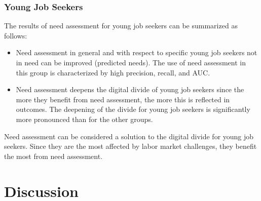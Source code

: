 \subsubsection{Young Job Seekers}
\label{sec:results_young}
The results of need assessment for young job seekers can be summarized as follows: 
\begin{itemize}
\item Need assessment in general and with respect to specific young job seekers not in need can be improved (predicted needs). The use of need assessment in this group is characterized by high precision, recall, and AUC.
\item Need assessment deepens the digital divide of young job seekers since the more they benefit from need assessment, the more this is reflected in outcomes. The deepening of the divide for young job seekers is significantly more pronounced than for the other groups.
\end{itemize}
Need assessment can be considered a solution to the digital divide for young job seekers. Since they are the most affected by labor market challenges, they benefit the most from need assessment.




\section{Discussion}

\label{sec:discussion}

